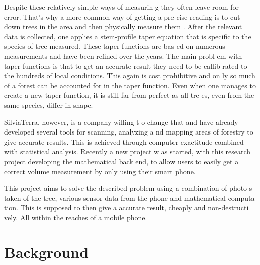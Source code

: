 Despite these relatively simple ways of measurin
g they often leave room for error. That’s why a more common way of getting a pre
cise reading is to cut down trees in the area and then physically measure them
. After the relevant data is collected, one applies a stem-profile taper equation
 that is specific to the species of tree measured. These taper functions are bas %
ed on numerous measurements and have been refined over the years. The main probl
em with taper functions is that to get an accurate result they need to be callib
rated to the hundreds of local conditions. This again is cost prohibitive and on
ly so much of a forest can be accounted for in the taper function. Even when one
 manages to create a new taper function, it is still far from perfect as all tre
es, even from the same species, differ in shape.

 SilviaTerra, however, is a company willing t
o change that and have already developed several tools for scanning, analyzing a
nd mapping areas of forestry to give accurate results. This is achieved through 
computer exactitude combined with statistical analysis. Recently a new project w %
as started, with this research project developing the mathematical back end, to 
allow users to easily get a correct volume measurement by only using their smart
 phone.

This project aims to solve 
the described problem %
using a combination of photo
s taken of the tree, various sensor data from the phone and mathematical computa
tion. This is supposed to then give a accurate result, cheaply and non-destructi
vely. All within the reaches of a mobile phone. %

\section{Background}

